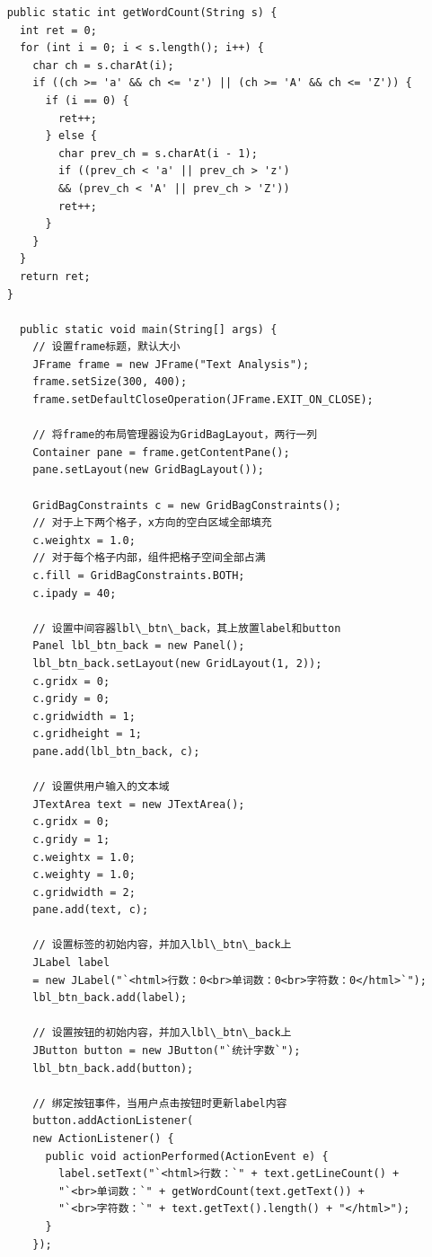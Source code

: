 \documentclass[11pt, a4paper]{article}
\begin{document}
\begin{CJK*}{UTF8}{gbsn}
\begin{lstlisting}
    public static int getWordCount(String s) {
      int ret = 0;
      for (int i = 0; i < s.length(); i++) {
        char ch = s.charAt(i);
        if ((ch >= 'a' && ch <= 'z') || (ch >= 'A' && ch <= 'Z')) {
          if (i == 0) {
            ret++;
          } else {
            char prev_ch = s.charAt(i - 1);
            if ((prev_ch < 'a' || prev_ch > 'z')
            && (prev_ch < 'A' || prev_ch > 'Z'))
            ret++;
          }
        }
      }
      return ret;
    }

      public static void main(String[] args) {
        // 设置frame标题，默认大小
        JFrame frame = new JFrame("Text Analysis");
        frame.setSize(300, 400);
        frame.setDefaultCloseOperation(JFrame.EXIT_ON_CLOSE);

        // 将frame的布局管理器设为GridBagLayout，两行一列
        Container pane = frame.getContentPane();
        pane.setLayout(new GridBagLayout());

        GridBagConstraints c = new GridBagConstraints();
        // 对于上下两个格子，x方向的空白区域全部填充
        c.weightx = 1.0;
        // 对于每个格子内部，组件把格子空间全部占满
        c.fill = GridBagConstraints.BOTH; 
        c.ipady = 40;

        // 设置中间容器lbl\_btn\_back，其上放置label和button
        Panel lbl_btn_back = new Panel();
        lbl_btn_back.setLayout(new GridLayout(1, 2));
        c.gridx = 0;
        c.gridy = 0;
        c.gridwidth = 1;
        c.gridheight = 1;
        pane.add(lbl_btn_back, c);

        // 设置供用户输入的文本域
        JTextArea text = new JTextArea();
        c.gridx = 0;
        c.gridy = 1;
        c.weightx = 1.0;
        c.weighty = 1.0;
        c.gridwidth = 2;
        pane.add(text, c);
        
        // 设置标签的初始内容，并加入lbl\_btn\_back上
        JLabel label
        = new JLabel("`<html>行数：0<br>单词数：0<br>字符数：0</html>`");
        lbl_btn_back.add(label);

        // 设置按钮的初始内容，并加入lbl\_btn\_back上
        JButton button = new JButton("`统计字数`");
        lbl_btn_back.add(button);

        // 绑定按钮事件，当用户点击按钮时更新label内容
        button.addActionListener(
        new ActionListener() {
          public void actionPerformed(ActionEvent e) {
            label.setText("`<html>行数：`" + text.getLineCount() +
            "`<br>单词数：`" + getWordCount(text.getText()) +
            "`<br>字符数：`" + text.getText().length() + "</html>");
          }
        });


\end{lstlisting}
\end{CJK*}
\end{document}
